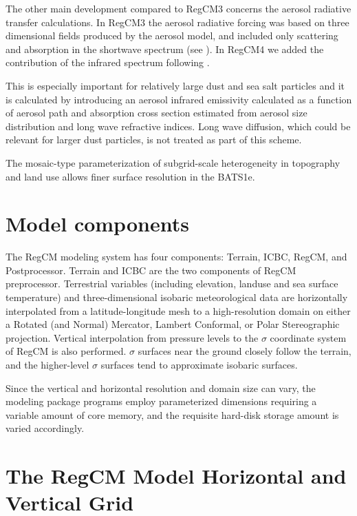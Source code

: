 The other main development compared to \ac{RegCM}3 concerns the aerosol
radiative transfer calculations. In \ac{RegCM}3 the aerosol radiative forcing
was based on three dimensional fields produced by the aerosol model, and
included only scattering and absorption in the shortwave spectrum (see
\cite{Giorgi_02}). In \ac{RegCM}4 we added the contribution of the infrared
spectrum following \cite{Solmon_08}.

This is especially important for relatively large dust and sea salt particles
and it is calculated by introducing an aerosol infrared emissivity calculated
as a function of aerosol path and absorption cross section estimated from
aerosol size distribution and long wave refractive indices. Long wave diffusion,
which could be relevant for larger dust particles, is not treated as part of
this scheme.

The mosaic-type parameterization of subgrid-scale heterogeneity in
topography and land use \citep{Giorgi_03} allows finer surface resolution
in the \ac{BATS1e}.

\section{Model components}

The \ac{RegCM} modeling system has four components: Terrain, ICBC, \ac{RegCM},
and Postprocessor.  Terrain and ICBC are the two components of \ac{RegCM}
preprocessor. Terrestrial variables (including elevation, landuse and sea
surface temperature) and three-dimensional isobaric meteorological data are
horizontally interpolated from a latitude-longitude mesh to a high-resolution
domain on either a Rotated (and Normal) Mercator, Lambert Conformal, or Polar
Stereographic projection. Vertical interpolation from pressure levels to the
$\sigma$ coordinate system of \ac{RegCM} is also performed. $\sigma$ surfaces
near the ground closely follow the terrain, and the higher-level $\sigma$
surfaces tend to approximate isobaric surfaces. 

Since the vertical and horizontal resolution and domain size can vary, the
modeling package programs employ parameterized dimensions requiring a variable
amount of core memory, and the requisite hard-disk storage amount is varied
accordingly.

\section{The \ac{RegCM} Model Horizontal and Vertical Grid}


